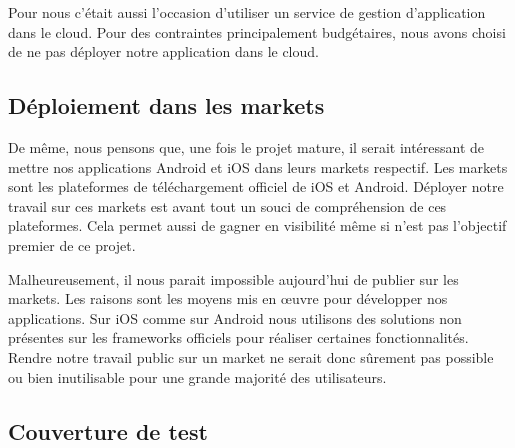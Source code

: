 Pour nous c'était aussi l'occasion d'utiliser un service de gestion d'application dans le cloud. Pour des contraintes
principalement budgétaires, nous avons choisi de ne pas déployer notre application dans le cloud.




\subsection{Déploiement dans les markets}

De même, nous pensons que, une fois le projet mature, il serait intéressant de mettre nos applications Android et iOS dans 
leurs markets respectif. Les markets sont les plateformes de téléchargement officiel de iOS et Android. Déployer notre 
travail sur ces markets est avant tout un souci de compréhension de ces plateformes. Cela permet aussi de gagner en visibilité
même si n'est pas l'objectif premier de ce projet.

Malheureusement, il nous parait impossible aujourd'hui de publier sur les markets. Les raisons sont les moyens mis en œuvre 
pour développer nos applications. Sur iOS comme sur Android nous utilisons des solutions non présentes sur les frameworks officiels
pour réaliser certaines fonctionnalités. Rendre notre travail public sur un market ne serait donc sûrement pas possible ou bien
inutilisable pour une grande majorité des utilisateurs.




\subsection{Couverture de test}

